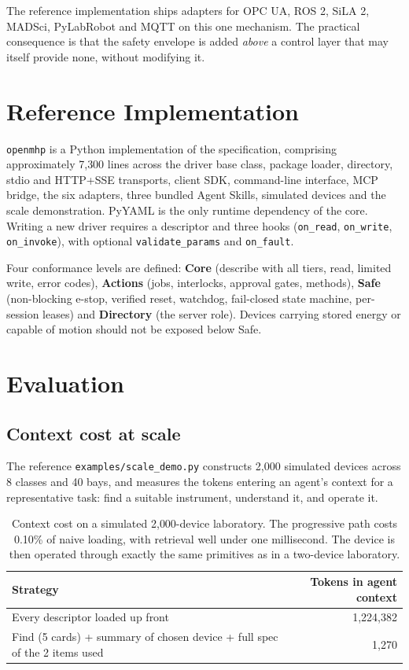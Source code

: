 \documentclass[11pt]{article}
\begin{document}
The reference implementation ships adapters for OPC UA, ROS 2, SiLA 2, MADSci, PyLabRobot and
MQTT on this one mechanism. The practical consequence is that the safety envelope is added
\emph{above} a control layer that may itself provide none, without modifying it.

\section{Reference Implementation}
\label{sec:impl}

\texttt{openmhp} is a Python implementation of the specification, comprising approximately
7{,}300 lines across the driver base class, package loader, directory, stdio and HTTP+SSE
transports, client SDK, command-line interface, MCP bridge, the six adapters, three bundled
Agent Skills, simulated devices and the scale demonstration. PyYAML is the only runtime
dependency of the core. Writing a new driver requires a descriptor and three hooks
(\texttt{on\_read}, \texttt{on\_write}, \texttt{on\_invoke}), with optional
\texttt{validate\_params} and \texttt{on\_fault}.

Four conformance levels are defined: \textbf{Core} (describe with all tiers, read, limited
write, error codes), \textbf{Actions} (jobs, interlocks, approval gates, methods),
\textbf{Safe} (non-blocking e-stop, verified reset, watchdog, fail-closed state machine,
per-session leases) and \textbf{Directory} (the server role). Devices carrying stored energy
or capable of motion should not be exposed below Safe.

\section{Evaluation}
\label{sec:eval}

\subsection{Context cost at scale}
The reference \texttt{examples/scale\_demo.py} constructs 2{,}000 simulated devices across 8
classes and 40 bays, and measures the tokens entering an agent's context for a representative
task: find a suitable instrument, understand it, and operate it.

\begin{table}[h]
\centering
\begin{tabular}{@{}p{}r@{}}
\toprule
\textbf{Strategy} & \textbf{Tokens in agent context} \\
\midrule
Every descriptor loaded up front & 1{,}224{,}382 \\
Find (5 cards) + summary of chosen device + full spec of the 2 items used & 1{,}270 \\
\bottomrule
\end{tabular}
\caption{Context cost on a simulated 2{,}000-device laboratory. The progressive path costs
0.10\% of naive loading, with retrieval well under one millisecond. The device is then operated
through exactly the same primitives as in a two-device laboratory.}
\label{tab:scale}
\end{table}
\end{document}
